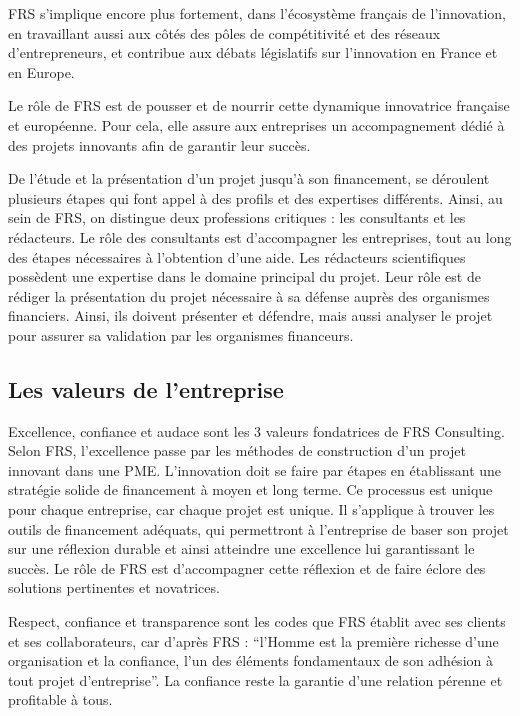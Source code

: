 \documentclass[french]{article}
\begin{document}
{FRS s'implique encore plus fortement, dans l’écosystème français de l’innovation, en travaillant aussi aux côtés des pôles de compétitivité et des réseaux d’entrepreneurs, et contribue aux débats législatifs sur l’innovation en France et en Europe.

Le rôle de FRS est de pousser et de nourrir cette dynamique innovatrice française et européenne. Pour cela, elle assure aux entreprises un accompagnement dédié à des projets innovants afin de garantir leur succès.

De l'étude et la présentation d'un projet jusqu'à son financement, se déroulent plusieurs étapes qui font appel à des profils et des expertises différents. Ainsi, au sein de FRS, on distingue deux professions critiques : les consultants et les rédacteurs. Le rôle des consultants est d'accompagner les entreprises, tout au long des étapes nécessaires à l'obtention d'une aide. 
\newline{}
Les rédacteurs scientifiques possèdent une expertise dans le domaine principal du projet. Leur rôle est de rédiger la présentation du projet nécessaire à sa défense auprès des organismes financiers. Ainsi, ils doivent présenter et défendre, mais aussi analyser le projet pour assurer sa validation par les organismes financeurs.

\subsection{Les valeurs de l'entreprise}

Excellence, confiance et audace sont les 3 valeurs fondatrices de FRS Consulting.
\newline{}
Selon FRS, l'excellence passe par les méthodes de construction d'un projet innovant dans une PME. L'innovation doit se faire par étapes en établissant une stratégie solide de financement à moyen et long terme. Ce processus est unique pour chaque entreprise, car chaque projet est unique. Il s'applique à trouver les outils de financement adéquats, qui permettront à l'entreprise de baser son projet sur une réflexion durable et ainsi atteindre une excellence lui garantissant le succès. Le rôle de FRS est d'accompagner cette réflexion et de faire éclore des solutions pertinentes et novatrices.

Respect, confiance et transparence sont les codes que FRS établit avec ses clients et ses collaborateurs, car d'après FRS : ``l’Homme est la première richesse d’une organisation et la confiance, l’un des éléments fondamentaux de son adhésion à tout projet d’entreprise''.
La confiance reste la garantie d'une relation pérenne et profitable à tous.

}
\end{document}
